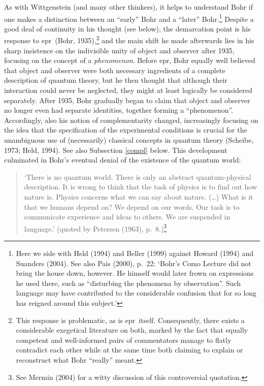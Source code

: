 \documentclass[12pt,titlepage]{article}
\newcommand{\epr}{{\sc epr}}
\begin{document}
As with Wittgenstein (and many other thinkers), it helps to understand Bohr if one makes a distinction between an ``early'' Bohr and a ``later'' Bohr.\footnote{Here we side with Held (1994) and Beller (1999) against Howard (1994) and Suanders (2004). See also Pais (2000), p.\ 22: `Bohr's Como Lecture did not bring the house down, however. He himself would later frown on expressions he used there, such as ``disturbing the phenomena by observation''. Such language may have contributed to the considerable confusion that for so long has reigned around this subject.'\label{paisnote}}  Despite a good deal of continuity in his thought (see below), the demarcation point is his response  to \epr\  (Bohr, 1935),\footnote{This response is problematic, as is \epr\  itself. Consequently, there exists a considerable exegetical literature on both, marked by the fact that equally competent and well-informed pairs of commentators manage to flatly contradict each other while at the same time both claiming to explain or reconstruct what Bohr ``really'' meant. }  and the main shift he  made afterwards lies in his sharp insistence on the indivisible unity of object and observer after 1935, focusing on the concept of a {\it phenomenon}.
  Before \epr, Bohr equally well believed that object and observer were both necessary ingredients of a complete description of quantum theory, but he then thought that although their interaction could never be neglected,  they might at least logically be considered separately. After 1935, Bohr gradually began to claim that object and observer no longer even had  separate identities, together forming a ``phenomenon''. Accordingly, also his notion of complementarity changed, increasingly focusing on the idea that the specification of the experimental conditions is crucial for the unambiguous use of (necessarily) classical concepts in quantum theory (Scheibe, 1973; Held, 1994). See also Subsection \ref{compl} below. 
This development culminated in Bohr's eventual denial of the existence of the quantum world: 
\begin{quote}
`There is no quantum world. There is only an abstract quantum-physical description. It is wrong to think that the task of physics is to find out how nature is. Physics concerns what we can say about nature. (\ldots) What is it that we humans depend on? We depend on our words. Our task is to communicate experience and ideas to others. We are suspended in language.' (quoted by Petersen (1963), p.\ 8.)\footnote{See Mermin (2004) 
for a witty discussion of this controversial  quotation.}  \end{quote}
\end{document}

